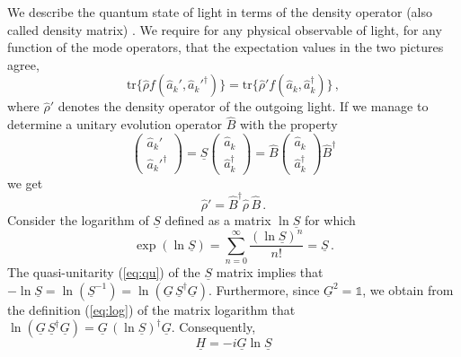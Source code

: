 \documentclass[12pt,amsmath,amssymb]{article}
\numberwithin{equation}{section}
\begin{document}
We describe the quantum state of light in terms of the density operator
(also called density matrix) \cite{Carmichael,Gardiner,LL5,Leonhardt}.
We require for any physical observable of light, for any
function of the mode operators, that the expectation values in
the two pictures agree,
\begin{equation}
\mathrm{tr}\{\hat{\rho}f(\hat{a}_k',\hat{a}_k'^\dagger)\} =
\mathrm{tr}\{\hat{\rho}'f(\hat{a}_k,\hat{a}_k^\dagger)\}
\,,
\end{equation}
where $\hat{\rho}'$ denotes the density operator of the outgoing light.
If we manage to determine a unitary evolution operator $\hat{B}$
with the property
\begin{equation}
\label{eq:bop}
\left(
    \begin{array}{c}
     \hat{a}_k'  \\
     \hat{a}_k'^\dagger
    \end{array}
\right)
=
\underline{S}
\left(
    \begin{array}{c}
     \hat{a}_k  \\
     \hat{a}_k^\dagger
    \end{array}
\right)
=
\hat{B}
\left(
    \begin{array}{c}
     \hat{a}_k  \\
     \hat{a}_k^\dagger
    \end{array}
\right)
\hat{B}^\dagger
\end{equation}
we get
\begin{equation}
\hat{\rho}' = \hat{B}^\dagger \hat{\rho}\,\hat{B}
\,.
\end{equation}
Consider the logarithm of $\underline{S}$ defined as a matrix
$\ln \underline{S}$ for which
\begin{equation}
\label{eq:log} \exp(\ln \underline{S}) = \sum_{n=0}^\infty
\frac{(\ln \underline{S})^n}{n!} = \underline{S} \,.
\end{equation}
The quasi-unitarity (\ref{eq:qu}) of the $\underline{S}$ matrix
implies that $-\ln\underline{S}=\ln(\underline{S}^{-1})=
\ln(\underline{G}\,\underline{S}^\dagger\underline{G})$.
Furthermore, since $\underline{G}^2=\mathds{1}$, we obtain from the
definition (\ref{eq:log}) of the matrix logarithm that
$\ln(\underline{G}\,\underline{S}^\dagger\underline{G})=
\underline{G}\,(\ln\underline{S})^\dagger\underline{G}$.
Consequently,
\begin{equation}
\label{eq:pdef} \underline{H} = -i\underline{G}\ln\underline{S}
\end{equation}
\end{document}
